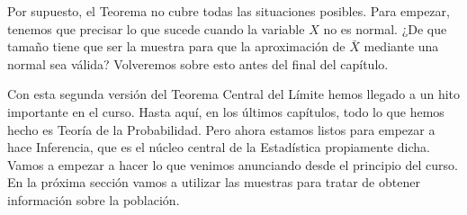 Por supuesto, el Teorema no cubre todas las situaciones posibles. Para empezar,
tenemos que precisar lo que sucede  cuando la variable $X$ no es normal. ¿De
que tamaño tiene que ser la muestra para que la aproximación de $\bar X$
mediante una normal sea válida? Volveremos sobre esto antes del final del
capítulo.
%

Con esta segunda versión del Teorema Central del Límite hemos llegado a un hito
importante en el curso. Hasta aquí, en los últimos capítulos,  todo lo que
hemos hecho es Teoría de la Probabilidad. Pero ahora estamos listos para
empezar a hace Inferencia, que es el núcleo central de la Estadística
propiamente dicha. Vamos a empezar a hacer lo que venimos anunciando desde el
principio del curso. En la próxima sección vamos a utilizar las muestras para
tratar de obtener información sobre la población.

%
%

%
%
%

